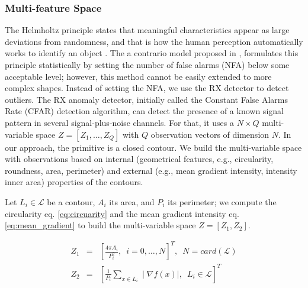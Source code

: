 \subsubsection{Multi-feature Space}\label{subsec:multispace}
The Helmholtz principle states that meaningful characteristics appear as large deviations from randomness, and that is how the human perception automatically works to identify an object \citep{Attneave:PR:1954}. The a contrario model proposed in \citep{Desolneux.Moisan.ea:Gestalt:2008}, formulates this principle statistically by setting the number of false alarms (NFA) below some acceptable level; however, this method cannot be easily extended to more complex shapes. Instead of setting the NFA, we use the RX detector \citep{Reed.Yu:TASSP:1990} to detect outliers. The RX anomaly detector, initially called the Constant False Alarms Rate (CFAR) detection algorithm, can detect the presence of a known signal pattern in several signal-plus-noise channels. For that, it uses a $N\times Q$ multi-variable space $Z=[Z_{1}, \ldots, Z_{Q}]$ with $Q$ observation vectors of dimension $N$. In our approach, the primitive is a closed contour. We build the multi-variable space with observations based on internal (geometrical features, e.g., circularity, roundness, area, perimeter) and external (e.g., mean gradient intensity, intensity inner area) properties of the contours.

Let $L_{i} \in \mathcal{L}$ be a contour, $A_{i}$ its area, and $P_{i}$ its perimeter; we compute the circularity eq. \eqref{eq:circuarity} and the mean gradient intensity eq. \eqref{eq:mean_gradient} to build the multi-variable space $Z=[Z_{1}, Z_{2}]$. 

\begin{eqnarray}
Z_{1}&=&\left[\frac{4\pi A_{i}}{P_{i}^2}, \enspace i=0, \ldots, N\right]^T,  \enspace N = card(\mathcal{L}) \label{eq:circuarity}  \\ 
Z_{2}&=&\left[\frac{1}{P_{i}}\sum\limits_{x \in L_{i}} \mid\nabla f(x) \mid, \enspace L_{i} \in \mathcal{L}\right]^T  \label{eq:mean_gradient}
\end{eqnarray}


